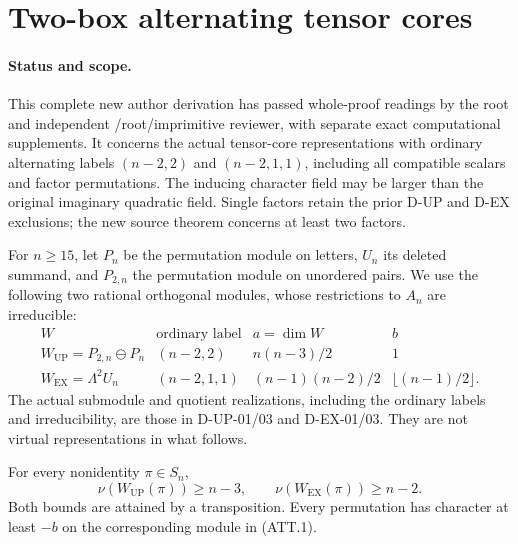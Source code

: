 \section{Two-box alternating tensor cores}
\label{sec:alternating-two-tail}

\paragraph{Status and scope.}
This complete new author derivation has passed whole-proof readings
by the root and independent /root/imprimitive reviewer, with separate
exact computational supplements. It concerns the actual tensor-core representations
with ordinary alternating labels $(n-2,2)$ and $(n-2,1,1)$, including
all compatible scalars and factor permutations. The inducing character
field may be larger than the original imaginary quadratic field.
Single factors retain the prior D-UP and D-EX exclusions; the new
source theorem concerns at least two factors.

For $n\ge15$, let $P_n$ be the permutation module on letters,
$U_n$ its deleted summand, and $P_{2,n}$ the permutation module
on unordered pairs. We use the following two rational orthogonal
modules, whose restrictions to $A_n$ are irreducible:
\[
\begin{array}{c|c|c|c}
W&\text{ordinary label}&a=\dim W&b\\\hline
W_{\mathrm{UP}}=P_{2,n}\ominus P_n&(n-2,2)&n(n-3)/2&1\\
W_{\mathrm{EX}}=\Lambda^2U_n&(n-2,1,1)&(n-1)(n-2)/2&\lfloor(n-1)/2\rfloor.
\end{array}                                                    \tag{ATT.1}
\]
The actual submodule and quotient realizations, including the
ordinary labels and irreducibility, are those in D-UP-01/03 and
D-EX-01/03. They are not virtual representations in what follows.

\begin{lemma}
\label{D-ATT-01}
For every nonidentity $\pi\in S_n$,
\[
 \nu(W_{\mathrm{UP}}(\pi))\ge n-3,
 \qquad \nu(W_{\mathrm{EX}}(\pi))\ge n-2.                    \tag{ATT.2}
\]
Both bounds are attained by a transposition. Every permutation
has character at least $-b$ on the corresponding module in
\textup{(ATT.1)}.
\end{lemma}

